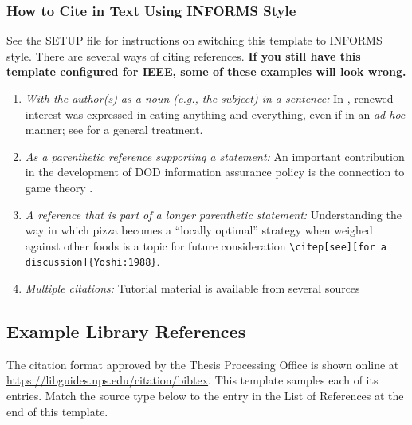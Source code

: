 \subsubsection{How to Cite in Text Using INFORMS Style}
See the SETUP file for instructions on switching this template to INFORMS style. There are several ways of citing references. \textbf{If you still have this template configured for IEEE, some of these examples will look wrong.}
\begin{enumerate}
    \item {\it With the author(s) as a noun (e.g., the subject) in a sentence:}
    In \citet{pollan_2006}, renewed interest was expressed in eating anything and everything, even if in an {\it ad hoc} manner; see \citet{Crabtree:Chaplin:2013} for a general treatment.  
    \item {\it As a parenthetic reference supporting a statement:} 
    An important contribution in the development of DOD information assurance policy is the connection to game theory \citep{DOD.8570.01-M}. 
    \item {\it A reference that is part of a longer parenthetic statement:} 
    Understanding the way in which pizza becomes a ``locally optimal'' strategy when weighed against other foods is a topic for future consideration \ifinforms\citep[see][for a discussion]{Yoshi:1988}\else\verb|\citep[see][for a discussion]{Yoshi:1988}|\fi.
    \item {\it Multiple citations:} 
    Tutorial material is available from several sources \citep{Monster:1985, Nekeip:2008, pollan_2006}
\end{enumerate}

\subsection{Example Library References}
The citation format approved by the Thesis Processing Office is shown online at \url{https://libguides.nps.edu/citation/bibtex}. This template samples each of its entries. Match the source type below to the entry in the List of References at the end of this template.

